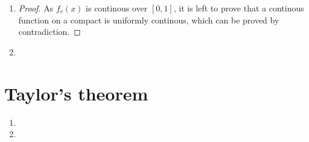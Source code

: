\documentclass[paper=a4, fontsize=11pt]{scrartcl} %
\numberwithin{equation}{section} %
\numberwithin{figure}{section} %
\numberwithin{table}{section} %
\begin{document}
\begin{enumerate}
\begin{proof}
				which is equivalent to 
				
				\begin{equation}
					n > \frac{ln(\frac{1}{6\xi})}{ln(3)} \triangleq N
				\end{equation}
				
				and the target $N$ is given as above.
			\end{proof}
		\item 
			\begin{proof}
				As $f_c(x)$ is continous over $[0, 1]$, it is left to prove that a continous function on a compact is uniformly continous, which can be proved by contradiction.
				
			\end{proof}
		
		\item 
		
	\end{enumerate}


\section{Taylor's theorem}
	\begin{enumerate}
		\item 

		\item 
		
	\end{enumerate}


\end{document}

